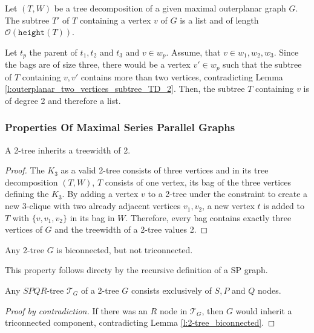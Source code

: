 \begin{lemma}
	Let $(T,W)$ be a tree decomposition of a given maximal outerplanar graph $G$. The subtree $T'$ of $T$ containing a vertex $v$ of $G$ is a list and of length $\mathcal{O}(\texttt{height}(T))$.
\end{lemma}
Let $t_p$ the parent of $t_1,t_2$ and $t_3$ and $v \in w_p$. Assume, that $v \in w_1,w_2,w_3$. Since the bags are of size three, there would be a vertex $v'\in w_p$ such that the subtree of $T$ containing $v,v'$ contains more than two vertices, contradicting Lemma \ref{l:outerplanar_two_vertices_subtree_TD_2}. Then, the subtree $T$ containing $v$ is of degree 2 and therefore a list.

\subsubsection{Properties Of Maximal Series Parallel Graphs}


\begin{lemma}
	A 2-tree inherits a treewidth of 2.
\end{lemma}
\begin{proof}
	The $K_3$ as a valid 2-tree consists of three vertices and in its tree decomposition $(T,W)$, $T$ consists of one vertex, its bag of the three vertices defining the $K_3$. By adding a vertex $v$ to a 2-tree under the constraint to create a new 3-clique with two already adjacent vertices $v_1,v_2$, a new vertex $t$ is added to $T$ with $\{v,v_1,v_2\}$ in its bag in $W$. Therefore, every bag contains exactly three vertices of $G$ and the treewidth of a 2-tree values 2.
\end{proof}

\begin{lemma}\label{l:2-tree_biconnected}
	Any 2-tree $G$ is biconnected, but not triconnected.
\end{lemma}
This property follows directy by the recursive definition of a SP graph.

\begin{lemma}
	Any $SPQR$-tree $\mathcal{T}_G$ of a 2-tree $G$ consists exclusively of $S,P$ and $Q$ nodes.
\end{lemma}
\begin{proof}[Proof by contradiction]
	If there was an $R$ node in $\mathcal{T}_G$, then $G$ would inherit a triconnected component, contradicting Lemma \ref{l:2-tree_biconnected}.
\end{proof}

